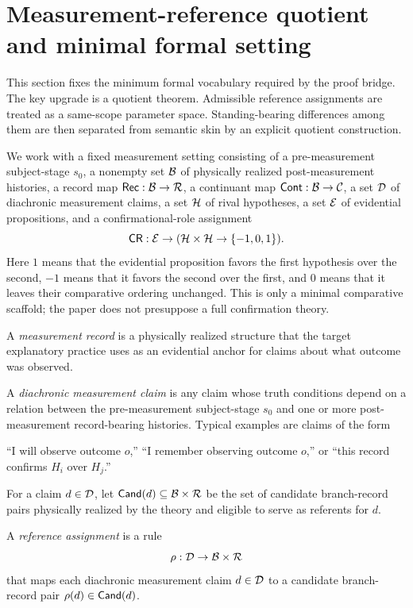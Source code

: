 \section{Measurement-reference quotient and minimal formal setting}
\label{sec:semanticcore}

This section fixes the minimum formal vocabulary required by the proof bridge. The key upgrade is a
quotient theorem. Admissible reference assignments are treated as a same-scope parameter space.
Standing-bearing differences among them are then separated from semantic skin by an explicit
quotient construction.

We work with a fixed measurement setting consisting of a pre-measurement subject-stage $s_0$, a
nonempty set $\mathcal{B}$ of physically realized post-measurement histories, a record map
$\mathsf{Rec}: \mathcal{B} \to \mathcal{R}$, a continuant map $\mathsf{Cont}: \mathcal{B} \to \mathcal{C}$, a set $\mathcal{D}$ of diachronic
measurement claims, a set $\mathcal{H}$ of rival hypotheses, a set $\mathcal{E}$ of evidential propositions,
and a confirmational-role assignment
\[
\mathsf{CR}: \mathcal{E} \to (\mathcal{H}\times\mathcal{H} \to \{-1,0,1\}).
\]
Here $1$ means that the evidential proposition favors the first hypothesis over the second, $-1$
means that it favors the second over the first, and $0$ means that it leaves their comparative
ordering unchanged. This is only a minimal comparative scaffold; the paper does not presuppose a
full confirmation theory.

\begin{definition}
\label{def:measurement-record}
A \emph{measurement record} is a physically realized structure that the target explanatory practice
uses as an evidential anchor for claims about what outcome was observed.
\end{definition}

A \emph{diachronic measurement claim} is any claim whose truth conditions depend on a relation
between the pre-measurement subject-stage $s_0$ and one or more post-measurement record-bearing
histories. Typical examples are claims of the form
\begin{center}
``I will observe outcome $o$,'' \quad ``I remember observing outcome $o$,'' \quad or \quad
``this record confirms $H_i$ over $H_j$.''
\end{center}

For a claim $d\in\mathcal{D}$, let $\mathsf{Cand}(d)\subseteq \mathcal{B}\times\mathcal{R}$ be the set of candidate
branch-record pairs physically realized by the theory and eligible to serve as referents for $d$.

\begin{definition}
\label{def:reference-assignment}
A \emph{reference assignment} is a rule
\[
\rho: \mathcal{D} \to \mathcal{B}\times\mathcal{R}
\]
that maps each diachronic measurement claim $d\in\mathcal{D}$ to a candidate branch-record pair
$\rho(d)\in\mathsf{Cand}(d)$.
\end{definition}

